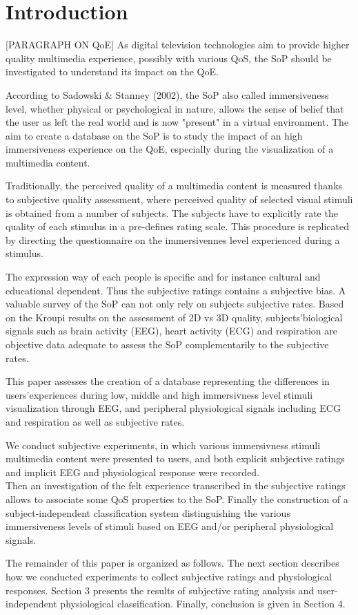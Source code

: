 \section{Introduction}
[PARAGRAPH ON QoE]
As digital television technologies aim to provide higher quality multimedia experience, possibly with various \ac{QoS}, the \ac{SoP} should be investigated to understand its impact on the \ac{QoE}.

According to Sadowski \& Stanney (2002), the \ac{SoP} also called immersiveness level, whether physical or psychological in nature, allows the sense of belief that the user as left the real world and is now "present" in a virtual environment. The aim to create a database on the \ac{SoP} is to study the impact of an high immersiveness experience on the \ac{QoE}, especially during the visualization of a multimedia content.

Traditionally, the perceived quality of a multimedia content is measured thanks to subjective quality assessment, where perceived quality of selected visual stimuli is obtained from a number of subjects. The subjects have to explicitly rate the quality of each stimulus in a pre-defines rating scale. This procedure is replicated by directing the questionnaire on the immersivennes level experienced during a stimulus.

The expression way of each people is specific and for instance cultural and educational dependent. Thus the subjective ratings contains a subjective bias. A valuable survey of the \ac{SoP} can not only rely on subjects subjective rates. Based on the  Kroupi results on the assessment of 2D vs 3D quality, subjects'biological signals such as brain activity (\ac{EEG}), heart activity (\ac{ECG}) and respiration are objective data adequate to assess the \ac{SoP} complementarily to the subjective rates.

This paper assesses the creation of a database representing the differences in users'experiences during low, middle and high immersivness level stimuli visualization through \ac{EEG}, and peripheral physiological signals including \ac{ECG} and respiration as well as subjective rates.

We conduct subjective experiments, in which various immersivness stimuli multimedia content were presented to users, and both explicit subjective ratings and implicit \ac{EEG} and physiological response were recorded.
\\Then an investigation of the felt experience transcribed in the subjective ratings allows to associate some \ac{QoS} properties to the \ac{SoP}. Finally the construction of a subject-independent classification system distinguishing the various immersiveness levels of stimuli based on \ac{EEG} and/or peripheral physiological signals.

The remainder of this paper is organized as follows.
The next section describes how we conducted experiments to collect subjective ratings and physiological responses. Section 3 presents the results of subjective rating analysis and user-independent physiological classification. Finally, conclusion is given in Section 4.